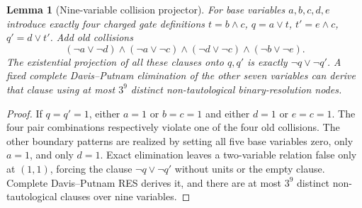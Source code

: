 \documentclass[11pt]{article}
\newtheorem{lemma}{Lemma}
\begin{document}
\begin{lemma}[Nine-variable collision projector]
For base variables $a,b,c,d,e$ introduce exactly four charged gate definitions
$t=b\land c$, $q=a\lor t$, $t'=e\land c$, $q'=d\lor t'$. Add old collisions
\[
(\neg a\vee\neg d)\wedge(\neg a\vee\neg c)
\wedge(\neg d\vee\neg c)\wedge(\neg b\vee\neg e).
\]
The existential projection of all these clauses onto $q,q'$ is exactly $\neg q\vee\neg q'$. A fixed complete Davis--Putnam elimination of the other seven variables can derive that clause using at most $3^9$ distinct non-tautological binary-resolution nodes.
\end{lemma}
\begin{proof}
If $q=q'=1$, either $a=1$ or $b=c=1$ and either $d=1$ or $e=c=1$. The four pair combinations respectively violate one of the four old collisions. The other boundary patterns are realized by setting all five base variables zero, only $a=1$, and only $d=1$. Exact elimination leaves a two-variable relation false only at $(1,1)$, forcing the clause $\neg q\vee\neg q'$ without units or the empty clause. Complete Davis--Putnam RES derives it, and there are at most $3^9$ distinct non-tautological clauses over nine variables. \end{proof}
\end{document}
